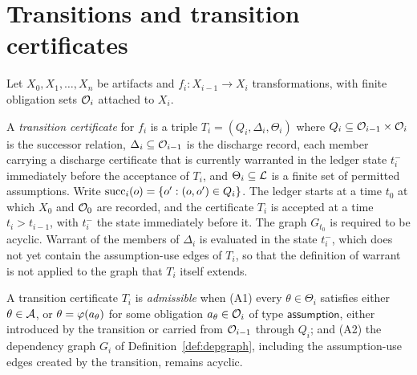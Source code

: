 \section{Transitions and transition certificates}

Let $X_0, X_1, \dots, X_n$ be artifacts and $f_i : X_{i-1} \to X_i$ transformations, with finite obligation sets $\mathcal{O}_i$ attached to $X_i$.

\begin{definition}
A \emph{transition certificate} for $f_i$ is a triple $T_i = (Q_i, \Delta_i, \Theta_i)$ where $Q_i \subseteq \mathcal{O}_{i-1} \times \mathcal{O}_i$ is the successor relation, $\Delta_i \subseteq \mathcal{O}_{i-1}$ is the discharge record, each member carrying a discharge certificate that is currently warranted in the ledger state $t_i^-$ immediately before the acceptance of $T_i$, and $\Theta_i \subseteq \mathcal{L}$ is a finite set of permitted assumptions. Write $\operatorname{succ}_i(o) = \{o' : (o,o') \in Q_i\}$. The ledger starts at a time $t_0$ at which $X_0$ and $\mathcal{O}_0$ are recorded, and the certificate $T_i$ is accepted at a time $t_i > t_{i-1}$, with $t_i^-$ the state immediately before it. The graph $G_{t_0}$ is required to be acyclic. Warrant of the members of $\Delta_i$ is evaluated in the state $t_i^-$, which does not yet contain the assumption-use edges of $T_i$, so that the definition of warrant is not applied to the graph that $T_i$ itself extends.
\end{definition}

\begin{definition}[Admissibility]
\label{def:admissible}
A transition certificate $T_i$ is \emph{admissible} when (A1) every $\theta \in \Theta_i$ satisfies either $\theta \in \mathcal{A}$, or $\theta = \varphi(a_\theta)$ for some obligation $a_\theta \in \mathcal{O}_i$ of type $\mathsf{assumption}$, either introduced by the transition or carried from $\mathcal{O}_{i-1}$ through $Q_i$; and (A2) the dependency graph $G_i$ of Definition~\ref{def:depgraph}, including the assumption-use edges created by the transition, remains acyclic.
\end{definition}

